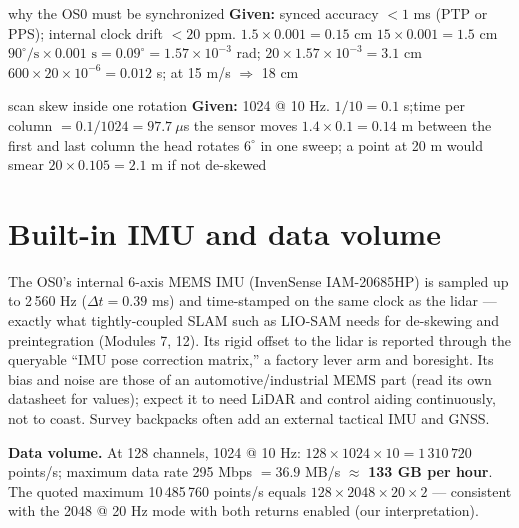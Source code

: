 \begin{worked}{why the OS0 must be synchronized}
\textbf{Given:} synced accuracy $<1$ ms (PTP or PPS); internal clock drift $<20$ ppm.
 $1.5\times0.001=0.15$ cm
 $15\times0.001=1.5$ cm
 $90^\circ/\text{s}\times0.001\text{ s}=0.09^\circ=1.57\times10^{-3}$ rad; $20\times1.57\times10^{-3}=3.1$ cm
 $600\times20\times10^{-6}=0.012$ s; at 15 m/s $\Rightarrow$ 18 cm
\end{worked}

\begin{worked}{scan skew inside one rotation}
\textbf{Given:} 1024 @ 10 Hz.
 $1/10=0.1$ s;\quad time per column $=0.1/1024=97.7\ \mu$s
 the sensor moves $1.4\times0.1=0.14$ m between the first and last column
 the head rotates $6^\circ$ in one sweep; a point at 20 m would smear $20\times0.105=2.1$ m if not de-skewed
\end{worked}

\section{Built-in IMU and data volume}
\begin{eng}
The OS0's internal 6-axis MEMS IMU (InvenSense IAM-20685HP) is sampled up to 2\,560 Hz ($\Delta t=0.39$ ms) and time-stamped on the same clock as the lidar --- exactly what tightly-coupled SLAM such as LIO-SAM needs for de-skewing and preintegration (Modules 7, 12). Its rigid offset to the lidar is reported through the queryable ``IMU pose correction matrix,'' a factory lever arm and boresight. Its bias and noise are those of an automotive/industrial MEMS part (read its own datasheet for values); expect it to need LiDAR and control aiding continuously, not to coast. Survey backpacks often add an external tactical IMU and GNSS.

\textbf{Data volume.} At 128 channels, 1024 @ 10 Hz: $128\times1024\times10=1\,310\,720$ points/s; maximum data rate 295 Mbps $=36.9$ MB/s $\approx$ \textbf{133 GB per hour}. The quoted maximum 10\,485\,760 points/s equals $128\times2048\times20\times2$ --- consistent with the 2048 @ 20 Hz mode with both returns enabled (our interpretation).
\end{eng}

